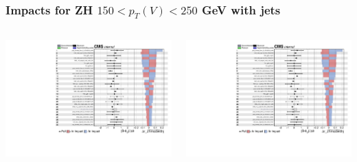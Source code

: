 \documentclass{beamer}
\begin{document}
\begin{frame}
  \frametitle{Impacts for ZH $150 < p_T(V) < 250$ GeV with jets}
  \centering
  \begin{columns}
    \begin{column}{0.5\linewidth}
      \includegraphics[width=0.85\linewidth,page=1]{figures/impacts/impacts_r_zhmedwithj.pdf}
    \end{column}
    \begin{column}{0.5\linewidth}
      \includegraphics[width=0.85\linewidth,page=2]{figures/impacts/impacts_r_zhmedwithj.pdf}
    \end{column}
  \end{columns}
\end{frame}
\end{document}
